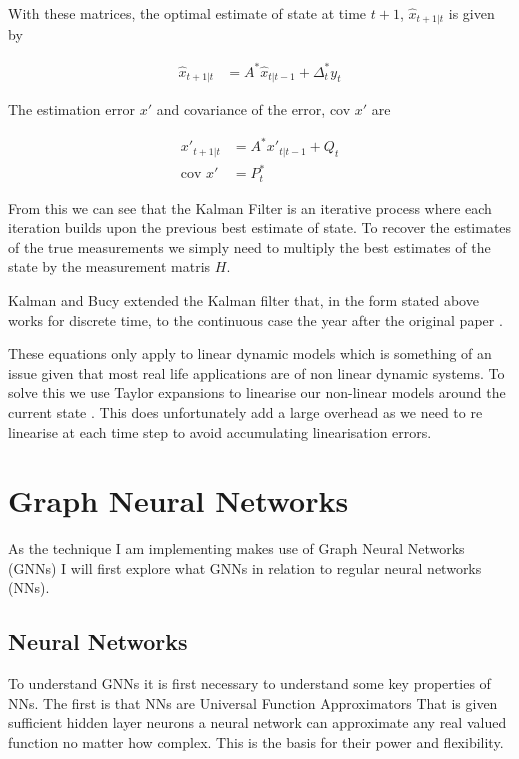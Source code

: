 \documentclass[]{../resources/final_report}
\begin{document}
With these matrices, the optimal estimate of state at time $t+1$, $\hat{x}_{t+1|t}$ is given by 

\begin{align}
  \hat{x}_{t+1|t} &= A^*\hat{x}_{t|t-1} + \Delta^*_ty_t
\end{align}

The estimation error $x'$ and covariance of the error, cov $x'$ are

\begin{align}
  x'_{t+1|t} &= A^*x'_{t|t-1} + Q_t \\
  \text{cov } x' &= P^*_t
\end{align}

From this we can see that the Kalman Filter is an iterative process where each iteration builds upon 
the previous best estimate of state. To recover the estimates of the true measurements we simply 
need to multiply the best estimates of the state by the measurement matris $H$.

Kalman and Bucy extended the Kalman filter that, in the form stated above works for discrete time, to the 
continuous case the year after the original paper \cite{Klmn1961NewRI}.

These equations only apply to linear dynamic models which is something of an issue given that most 
real life applications are of non linear dynamic systems. To solve this we use Taylor expansions to 
linearise our non-linear models around the current state \cite{ExtendedKalmanNasa}. This does 
unfortunately add a large overhead as we need to re linearise at each time step to avoid 
accumulating linearisation errors.

\section{Graph Neural Networks}

As the technique I am implementing makes use of Graph Neural Networks (GNNs) I will first explore
what GNNs in relation to regular neural networks (NNs).

\subsection{Neural Networks}
To understand GNNs it is first necessary to understand some key properties
of NNs. The first is that NNs are Universal Function Approximators \cite{Hornik}
That is given sufficient hidden layer neurons a neural network can approximate any real valued function 
no matter how complex. This is the basis for their power and flexibility.
\end{document}
